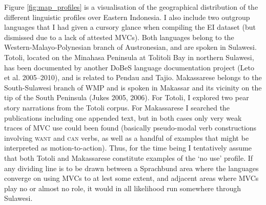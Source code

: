 Figure \ref{fig:map_profiles} is a visualisation of the geographical distribution of the different linguistic profiles over Eastern Indonesia. I also include two outgroup languages that I had given a cursory glance when compiling the EI dataset (but dismissed due to a lack of attested MVCs). Both languages belong to the Western-Malayo-Polynesian branch of Austronesian, and are spoken in Sulawesi. Totoli, located on the Minahasa Peninsula at Tolitoli Bay in northern Sulawesi, has been documented by another DoBeS language documentation project (Leto et al. 2005--2010), and is related to Pendau and Tajio. Makassarese belongs to the South-Sulawesi branch of WMP and is spoken in Makassar and its vicinity on the tip of the South Peninsula (Jukes 2005, 2006). For Totoli, I explored two pear story narrations from the Totoli corpus. For Makassarese I searched the publications including one appended text, but in both cases only very weak traces of MVC use could been found (basically pseudo-modal verb constructions involving \textsc{want} and \textsc{can} verbs, as well as a handful of examples that might be interpreted as motion-to-action). Thus, for the time being I tentatively assume that both Totoli and Makassarese constitute examples of the `no use' profile. If any dividing line is to be drawn between a Sprachbund area where the languages converge on using MVCs to at lest some extent, and adjacent areas where MVCs play no or almost no role, it would in all likelihood run somewhere through Sulawesi.

